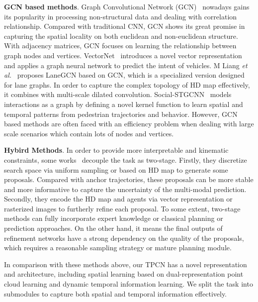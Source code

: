\documentclass[final]{cvpr}
\begin{document}
\noindent\textbf{GCN based methods}. Graph Convolutional Network (GCN)~\cite{duvenaud2015convolutional,henaff2015deep,shuman2013emerging} nowadays gains its popularity in processing non-structural data and dealing with correlation relationship. Compared with traditional CNN, GCN shows its great promise in capturing the spatial locality on both euclidean and non-euclidean structure. 
With adjacency matrices, GCN focuses on learning the relationship between graph nodes and vertices. VectorNet~\cite{gao2020vectornet} introduces a novel vector representation and applies a graph neural network to predict the intent of vehicles. M Liang \textit{et al.}~\cite{liang2020learning} proposes LaneGCN based on GCN, which is a specialized version designed for lane graphs. In order to capture the complex topology of HD map effectively, 
it combines with multi-scale dilated convolution. Social-STGCNN~\cite{mohamed2020social} models interactions as a graph by defining a novel kernel function to learn spatial and temporal patterns from pedestrian trajectories and behavior. However, GCN based methods are often faced with an efficiency problem when dealing with large scale scenarios which contain lots of nodes and vertices.  

\noindent\textbf{Hybird Methods}. In order to provide more interpretable and kinematic constraints, some works~\cite{casas2018intentnet, mangalam2020not, zhao2020tnt, zeng2019end} decouple the task as two-stage. Firstly, they discretize search space via uniform sampling or based on HD map to generate some proposals. Compared with anchor trajectories, these proposals can be more stable and more informative to capture the uncertainty of the multi-modal prediction. 
Secondly, they encode the HD map and agents via vector representation or rasterized images to furtherly refine each proposal. To some extent, two-stage methods can fully incorporate expert knowledge or classical planning or prediction approaches. On the other hand, it means the final outputs of refinement networks have a strong dependency on the quality of the proposals, which requires a reasonable sampling strategy or mature planning module. 

In comparison with these methods above, our TPCN has a novel representation and architecture, including spatial learning based on dual-representation point cloud learning and dynamic temporal information learning. We split the task into submodules to capture both spatial and temporal information effectively.
\end{document}
